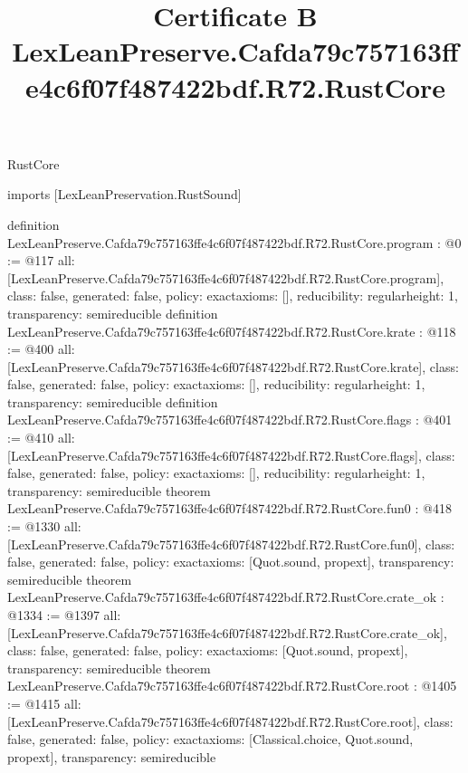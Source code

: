 \begin{lexlean}{RustCore}
\title{Certificate B LexLeanPreserve.Cafda79c757163ffe4c6f07f487422bdf.R72.RustCore}
\begin{coremodule}
imports [LexLeanPreservation.RustSound]

definition LexLeanPreserve.Cafda79c757163ffe4c6f07f487422bdf.R72.RustCore.program : @0 := @117 {
  all: [LexLeanPreserve.Cafda79c757163ffe4c6f07f487422bdf.R72.RustCore.program],
  class: false,
  generated: false,
  policy: exact{axioms: []},
  reducibility: regular{height: 1},
  transparency: semireducible
}
definition LexLeanPreserve.Cafda79c757163ffe4c6f07f487422bdf.R72.RustCore.krate : @118 := @400 {
  all: [LexLeanPreserve.Cafda79c757163ffe4c6f07f487422bdf.R72.RustCore.krate],
  class: false,
  generated: false,
  policy: exact{axioms: []},
  reducibility: regular{height: 1},
  transparency: semireducible
}
definition LexLeanPreserve.Cafda79c757163ffe4c6f07f487422bdf.R72.RustCore.flags : @401 := @410 {
  all: [LexLeanPreserve.Cafda79c757163ffe4c6f07f487422bdf.R72.RustCore.flags],
  class: false,
  generated: false,
  policy: exact{axioms: []},
  reducibility: regular{height: 1},
  transparency: semireducible
}
theorem LexLeanPreserve.Cafda79c757163ffe4c6f07f487422bdf.R72.RustCore.fun0 : @418 := @1330 {
  all: [LexLeanPreserve.Cafda79c757163ffe4c6f07f487422bdf.R72.RustCore.fun0],
  class: false,
  generated: false,
  policy: exact{axioms: [Quot.sound, propext]},
  transparency: semireducible
}
theorem LexLeanPreserve.Cafda79c757163ffe4c6f07f487422bdf.R72.RustCore.crate_ok : @1334 := @1397 {
  all: [LexLeanPreserve.Cafda79c757163ffe4c6f07f487422bdf.R72.RustCore.crate_ok],
  class: false,
  generated: false,
  policy: exact{axioms: [Quot.sound, propext]},
  transparency: semireducible
}
theorem LexLeanPreserve.Cafda79c757163ffe4c6f07f487422bdf.R72.RustCore.root : @1405 := @1415 {
  all: [LexLeanPreserve.Cafda79c757163ffe4c6f07f487422bdf.R72.RustCore.root],
  class: false,
  generated: false,
  policy: exact{axioms: [Classical.choice, Quot.sound, propext]},
  transparency: semireducible
}


\end{coremodule}
\end{lexlean}
